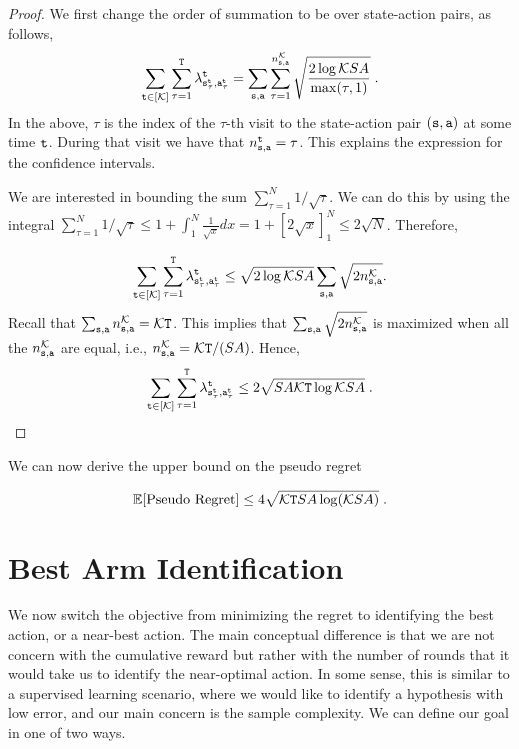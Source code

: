 \begin{proof}
    We first change the order of summation to be over state-action pairs, as follows,
    \[
    \sum_{{\tt t}\in [\mathcal K]} \sum_{\tau=1}^{\tt T}
\lambda^{\tt t}_{{\tt s}_\tau^{\tt t},{\tt a}_\tau^{\tt t}} =
\sum_{{\tt s},{\tt a}} \sum_{\tau=1}^{n_{{\tt s},{\tt a}}^\mathcal K}
\sqrt{\frac{2\log \mathcal K SA}{\max(\tau,1)}}\;.
    \]
In the above, $\tau$ is the index of the $\tau$-th visit to the state-action pair $({\tt s},{\tt a})$ at some time ${\tt t}$. During that visit we have that  $n_{{\tt s},{\tt a}}^{\tt t}=\tau$.
This explains the expression for the confidence intervals.

We are interested in bounding the sum $\sum_{\tau=1}^N 1/\sqrt{\tau}$. We can do this by using the integral $\sum_{\tau=1}^N 1/\sqrt{\tau}\leq 1+ \int_1^N \frac{1}{\sqrt{x}}dx= 1+[2\sqrt{x}]_1^N\leq 2\sqrt{N}$.
Therefore,

    \[
    \sum_{{\tt t}\in [\mathcal K]} \sum_{\tau=1}^{\tt T}
\lambda^{\tt t}_{{\tt s}_\tau^{\tt t},{\tt a}_\tau^{\tt t}} \leq
\sqrt{2\log \mathcal K SA}
\sum_{{\tt s},{\tt a}}
\sqrt{2 n_{{\tt s},{\tt a}}^\mathcal K }.
    \]
Recall that $\sum_{{\tt s},{\tt a}} n_{{\tt s},{\tt a}}^\mathcal K  =\mathcal K {\tt T}$. This implies that $\sum_{{\tt s},{\tt a}}
\sqrt{2 n_{{\tt s},{\tt a}}^\mathcal K }$ is maximized when all the $n_{{\tt s},{\tt a}}^\mathcal K $ are equal, i.e., $n_{{\tt s},{\tt a}}^\mathcal K =\mathcal K {\tt T}/(SA)$. Hence,
    \[
    \sum_{{\tt t}\in [\mathcal K]} \sum_{\tau=1}^{\tt T}
\lambda^{\tt t}_{{\tt s}_\tau^{\tt t},{\tt a}_\tau^{\tt t}} \leq
2
\sqrt{SA\mathcal K {\tt T}\log \mathcal K SA}\;.
    \]
\end{proof}

We can now derive the upper bound on the pseudo regret
\begin{theorem}
    \[
    \mathbb{E}[\text{Pseudo Regret}] \leq 4\sqrt{\mathcal K {\tt T} SA\log (\mathcal K SA)}\;.
    \]
\end{theorem}

\section{Best Arm Identification}

We now switch the objective from minimizing the regret to identifying the best action, or a near-best action. The main conceptual difference is that we are not concern with the cumulative reward but rather with the number of rounds that it would take us to identify the near-optimal action. 
In some sense, this is similar to a supervised learning scenario, where we would like to identify a hypothesis with low error, and our main concern is the sample complexity.
We can define our goal in one of two ways.

